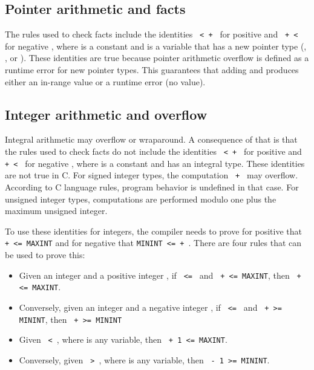 \subsection{Pointer arithmetic and facts}

The rules used to check facts include the identities \texttt{ <  + }
for positive  and \texttt{ +  < } for
negative , where  is a
constant and  is a variable that has a new pointer type (\ptr,
\spanptr, or \arrayptr). These identities are true
because pointer arithmetic overflow is defined as a runtime error for
new pointer types. This guarantees that adding  and  produces either
an in-range value or a runtime error (no value).

\subsection{Integer arithmetic and overflow}
\label{section:where-clauses-and-overflow}

Integral arithmetic may overflow or wraparound. A consequence of that is
that the rules used to check facts do not include the identities 
\texttt{ <  + } 
for positive  and \texttt{ +  < } for 
negative , where  is a
constant and  has an integral type. These identities are not true in C.  For signed integer types, the computation \texttt{ + }
may overflow.   According to C language
rules, program behavior is undefined in that case.  For unsigned
integer types, computations are performed modulo one plus
the maximum unsigned integer.

To use these identities for integers, the compiler needs to prove for
positive  that \texttt{ +  <= MAXINT} and for negative  that \texttt{MININT <=  + }.  There are four rules that can be used to prove this:

\begin{itemize}
\item
  Given an integer  and a positive integer , if 
  \texttt{ <= } and \texttt{ +  <= MAXINT},
  then \texttt{ +  <= MAXINT}.
\item
  Conversely, given an integer  and a negative integer 
  , if \texttt{ <= } and \texttt{ +
    >= MININT}, then \texttt{ +  >= MININT}
\item
  Given \texttt{ < }, where  is any variable, 
  then \texttt{ + 1 <= MAXINT}.
\item
  Conversely, given \texttt{ > }, where 
  is any variable, then \texttt{ - 1 >= MININT}.
\end{itemize}

